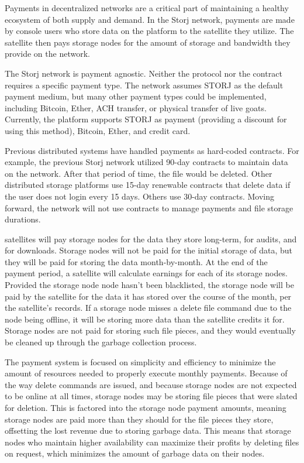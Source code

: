 \documentclass[a4paper,10pt]{article} \usepackage[utf8]{inputenc}
\begin{document}
Payments in decentralized networks are a critical part of maintaining a healthy
ecosystem of both supply and demand.
In the Storj network, payments are made by console users who store data on the
platform to the satellite they utilize.
The satellite then pays storage nodes for the amount of storage and bandwidth 
they
provide on the network.

The Storj network is payment agnostic.
Neither the protocol nor the contract requires a specific payment type.
The network assumes STORJ as the default payment medium, but many other payment
types could be implemented, including Bitcoin, Ether, ACH transfer, or physical
transfer of live goats.
Currently, the platform supports STORJ as payment (providing a discount for
using this method), Bitcoin, Ether, and credit card.

Previous distributed systems have handled payments as hard-coded contracts.
For example, the previous Storj network utilized 90-day contracts to maintain
data on the network. After that period of time, the file would be deleted.
Other distributed storage platforms use 15-day renewable contracts that delete
data if the user does not login every 15 days. Others use 30-day contracts.
Moving forward, the network will not use contracts to manage payments and file
storage durations.

satellites will pay storage nodes for the data they store long-term, 
for audits, and for downloads. 
Storage nodes will not be paid for the initial storage of data, but they
will be paid for storing the data month-by-month. At the end of the payment
period, a satellite will calculate earnings for each of its storage nodes. 
Provided the storage node node hasn’t been blacklisted, 
the storage node will be paid by the satellite for the data it has stored 
over the course of
the month, per the satellite's records. 
If a storage node misses a delete file command due to the node being
offline, it will be storing more data than the satellite credits it for. 
Storage nodes are not paid for storing such file pieces, and they
would eventually be cleaned up through the garbage collection process.

The payment system is focused on simplicity and efficiency to minimize the
amount of resources needed to properly execute monthly payments. Because of the
way delete commands are issued, and because storage nodes are not expected to be
online at all times, storage nodes may be storing file pieces that were slated 
for
deletion. This is factored into
the storage node payment amounts, meaning storage nodes are paid more than they
should for the file pieces they store, offsetting the lost revenue due to
storing garbage data. 
This means that storage nodes who maintain higher availability
can maximize their profits by deleting files on request,
which minimizes the amount
of garbage data on their nodes.
\end{document}
